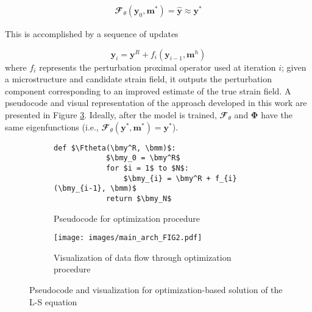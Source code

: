 \documentclass[3p, preprint]{elsarticle}
\newcommand{\bmm}{\bm{m}}
\newcommand{\bmy}{\bm{y}}
\newcommand{\Phiop}{\bm{\Phi}}
\newcommand{\Ftheta}{\mathbfcal{F}_\theta}
\newenvironment{revision} {} {}
\begin{document}
\begin{align}
    \Ftheta(\bmy_0, \bmm^*) = \hat{\bmy} \approx \bmy^*
\end{align}

\noindent This is accomplished by a sequence of updates

\begin{equation}
    \bmy_{i} = \bmy^R + f_{i} (\bmy_{i-1}, \bmm^h) 
\end{equation}
\noindent where $f_i$ represents the perturbation proximal operator used at iteration $i$; given a microstructure and candidate strain field, it outputs the perturbation component corresponding to an improved estimate of the true strain field. A pseudocode and visual representation of the approach developed in this work are presented in Figure \ref{fig:RLN_overview}. Ideally, after the model is trained, $\Ftheta$ and $\Phiop$ have the same eigenfunctions (i.e., $\Ftheta(\bmy^*, \bmm^*) = \bmy^*$). 

\begin{figure}
\centering
    \begin{subfigure}[b]{0.6\columnwidth}
        \begin{lstlisting}[mathescape=true, frame=single]
        def $\Ftheta(\bmy^R, \bmm)$:
            $\bmy_0 = \bmy^R$
            for $i = 1$ to $N$:
                $\bmy_{i} = \bmy^R + f_{i} (\bmy_{i-1}, \bmm)$
            return $\bmy_N$
        \end{lstlisting}
    
    \caption{Pseudocode for \begin{revision} optimization procedure\end{revision}}
    \label{lst:pseudocode}
    \end{subfigure}
    
    \begin{subfigure}[b]{0.6\columnwidth}
        \centering
        \texttt{[image: images/main\_arch\_FIG2.pdf]}
        \caption{Visualization of data flow through \begin{revision} optimization procedure\end{revision}}
        \label{fig:RLN_diag}
    \end{subfigure}

\caption{Pseudocode and visualization for \begin{revision} optimization-based solution of the L-S equation\end{revision}}
\label{fig:RLN_overview}

\end{figure}
\end{document}
